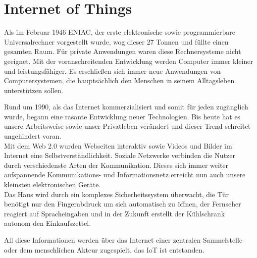 \chapter{Internet of Things}\label{c:IoT}

Als im Februar 1946 ENIAC, der erste elektronische sowie programmierbare Universalrechner vorgestellt wurde, wog dieser 27 Tonnen und füllte einen gesamten Raum. Für private Anwendungen waren diese Rechnersysteme nicht geeignet. Mit der voranschreitenden Entwicklung werden Computer immer kleiner und leistungsfähiger. Es erschließen sich immer neue Anwendungen von Computersystemen, die hauptsächlich den Menschen in seinem Alltagsleben unterstützen sollen.

Rund um 1990, als das Internet kommerzialisiert und somit für jeden zugänglich wurde, begann eine rasante Entwicklung neuer Technologien. Bis heute hat es unsere Arbeitsweise sowie unser Privatleben verändert und dieser Trend schreitet ungehindert voran.\\

Mit dem Web 2.0 wurden Webseiten interaktiv sowie Videos und Bilder im Internet eine Selbstverständlichkeit. 
Soziale Netzwerke verbinden die Nutzer durch verschiedenste Arten der Kommunikation. Dieses sich immer weiter aufspannende Kommunikations- und Informationsnetz erreicht nun auch unsere kleinsten elektronischen Geräte.\\ 
Das Haus wird durch ein komplexes Sicherheitssystem überwacht, die Tür benötigt nur den Fingerabdruck um sich automatisch zu öffnen, der Fernseher reagiert auf Spracheingaben und in der Zukunft erstellt der Kühlschrank autonom den Einkaufszettel.

All diese Informationen werden über das Internet einer zentralen Sammelstelle oder dem menschlichen Akteur zugespielt, das \ac{IoT} ist entstanden.







